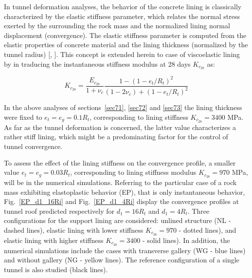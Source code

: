 \documentclass[a4paper,fleqn]{cas-sc}
\begin{document}
In tunnel deformation analyses, the behavior of the concrete lining is classically characterized by the elastic stiffness parameter, which relates the normal stress exerted by the surrounding the rock mass and the normalized lining normal displacement (convergence).   The elastic stiffness parameter is computed from the elastic properties of concrete material and the lining thickness (normalized by the tunnel radius) [, ]. This concept is extended herein to case of viscoelastic lining by in traducing the instantaneous stiffness modulus at 28 days $K_{c_{28}}$ as:

\begin{equation} \label{eq:8}
	K_{c_{28}} = \frac{E_{c_{28}}}{1+\nu_c}\frac{1-(1-e_t/R_t)^2}{(1-2\nu_c)+(1-e_t/R_t)^2}
\end{equation}

In the above analyses of sections~\ref{sec71}, \ref{sec72} and \ref{sec73} the lining thickness were fixed to $e_t=e_g=0.1R_t$, corresponding to lining stiffness  $K_{c_{28}}=3400$ MPa. As far as the tunnel deformation is concerned, the latter value characterizes a rather stiff lining, which might be a predominating factor for the control of tunnel convergence.

To assess the effect of the lining stiffness on the convergence profile, a smaller value $e_t=e_g=0.03R_t$, corresponding to lining stiffness modulus $K_{c_{28}}=970$ MPa, will be in the numerical simulations. Referring to the particular case of a rock mass exhibiting elastoplastic behavior (EP), that is only instantaneous behavior, Fig.~\ref{EP_d1_16Ri} and Fig.~\ref{EP_d1_4Ri} display the convergence profiles at tunnel roof predicted respectively for $d_1=16R_t$ and $d_1=4R_t$.  Three configurations for the support lining are considered: unlined structure (NL - dashed lines), elastic lining with lower stiffness $K_{c_{28}}=970$ - dotted lines), and elastic lining with higher stiffness $K_{c_{28}}=3400$ - solid lines). In addition, the numerical simulations include the cases with transverse gallery (WG - blue lines) and without gallery (NG - yellow lines). The reference configuration of a single tunnel is also studied (black lines). 
\end{document}
